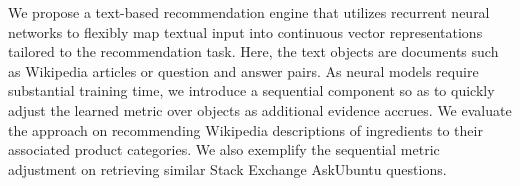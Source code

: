 We propose a text-based recommendation engine that utilizes recurrent neural networks to flexibly map textual input into continuous vector representations tailored to the recommendation task. Here, the text objects are documents such as Wikipedia articles or question and answer pairs. As neural models require substantial training time, we introduce a sequential component so as to quickly adjust the learned metric over objects as additional evidence accrues. We evaluate the approach on recommending Wikipedia descriptions of ingredients to their associated product categories. We also exemplify the sequential metric adjustment on retrieving similar Stack Exchange AskUbuntu questions.
